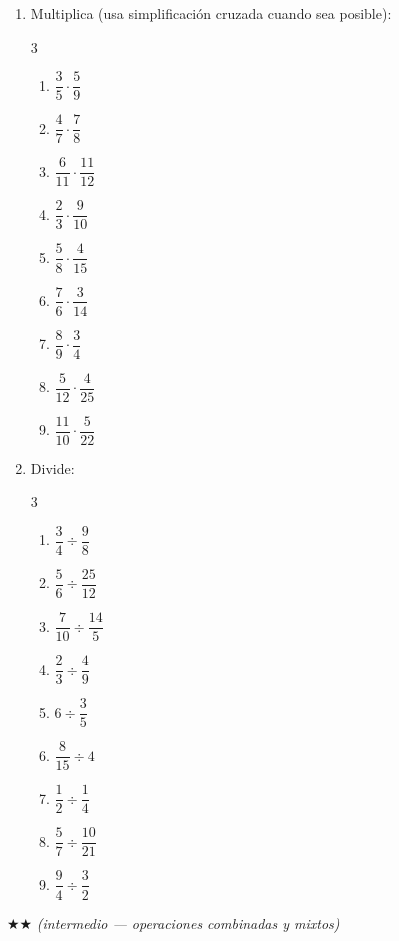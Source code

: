 \documentclass[11pt, letterpaper]{article}
\begin{document}
\begin{enumerate}[label=\textbf{\arabic*.}, leftmargin=*]
\item Multiplica (usa simplificaci\'on cruzada cuando sea posible):
\begin{multicols}{3}
\begin{enumerate}[label=\alph*)]
  \item $\dfrac{3}{5}\cdot\dfrac{5}{9}$
  \item $\dfrac{4}{7}\cdot\dfrac{7}{8}$
  \item $\dfrac{6}{11}\cdot\dfrac{11}{12}$
  \item $\dfrac{2}{3}\cdot\dfrac{9}{10}$
  \item $\dfrac{5}{8}\cdot\dfrac{4}{15}$
  \item $\dfrac{7}{6}\cdot\dfrac{3}{14}$
  \item $\dfrac{8}{9}\cdot\dfrac{3}{4}$
  \item $\dfrac{5}{12}\cdot\dfrac{4}{25}$
  \item $\dfrac{11}{10}\cdot\dfrac{5}{22}$
\end{enumerate}
\end{multicols}

\item Divide:
\begin{multicols}{3}
\begin{enumerate}[label=\alph*)]
  \item $\dfrac{3}{4}\div\dfrac{9}{8}$
  \item $\dfrac{5}{6}\div\dfrac{25}{12}$
  \item $\dfrac{7}{10}\div\dfrac{14}{5}$
  \item $\dfrac{2}{3}\div\dfrac{4}{9}$
  \item $6\div\dfrac{3}{5}$
  \item $\dfrac{8}{15}\div4$
  \item $\dfrac{1}{2}\div\dfrac{1}{4}$
  \item $\dfrac{5}{7}\div\dfrac{10}{21}$
  \item $\dfrac{9}{4}\div\dfrac{3}{2}$
\end{enumerate}
\end{multicols}

\end{enumerate}

$\bigstar\bigstar$ \textit{(intermedio --- operaciones combinadas y mixtos)}
\end{document}
